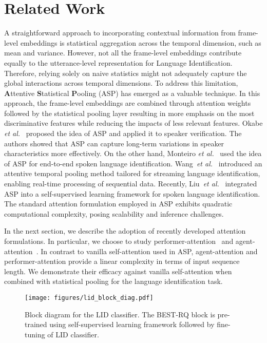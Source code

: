 \section{Related Work}
A straightforward approach to incorporating contextual information from frame-level embeddings is statistical aggregation across the temporal dimension, such as mean and variance. 
However, not all the frame-level embeddings contribute equally to the utterance-level representation for Language Identification. Therefore, relying solely on naive statistics might not adequately capture the global interactions across temporal dimensions. 
To address this limitation, \textbf{A}ttentive \textbf{S}tatistical \textbf{P}ooling (ASP) has emerged as a valuable technique.
In this approach, the frame-level embeddings are combined through attention weights followed by the statistical pooling layer resulting in more emphasis on the most discriminative features while reducing the impacts of less relevant features.  
Okabe \emph{et al.}~\cite{ASP_Okabe2018} proposed the idea of ASP and applied it to speaker verification.
The authors showed that ASP can capture long-term variations in speaker characteristics more effectively. 
On the other hand, Monteiro \emph{et al.}~\cite{ASP_Monteiro2020} used the idea of ASP for end-to-end spoken language identification.
Wang~\emph{et al.}~\cite{ASP_Wang2022} introduced an attentive temporal pooling method tailored for streaming language identification, enabling real-time processing of sequential data. 
Recently, Liu~\emph{et al.}~\cite{ASP_Liu2022} integrated ASP into a self-supervised learning framework for spoken language identification. 
The standard attention formulation employed in ASP exhibits quadratic computational complexity, posing scalability and inference challenges.\par  
In the next section, we describe the adoption of recently developed attention formulations.
In particular, we choose to study performer-attention~\cite{performer_Choromanski2020} and agent-attention~\cite{agent_attn_Han2023}.
In contrast to vanilla self-attention used in ASP, agent-attention and performer-attention provide a linear complexity in terms of input sequence length.
We demonstrate their efficacy against vanilla self-attention when combined with statistical pooling for the language identification task.
\begin{figure}[!t]
    \centering
    \texttt{[image: figures/lid\_block\_diag.pdf]}
    \caption{Block diagram for the LID classifier. The BEST-RQ block is pre-trained using self-supervised learning framework followed by fine-tuning of LID classifier.}
    \label{fig:lid_block}
\end{figure}